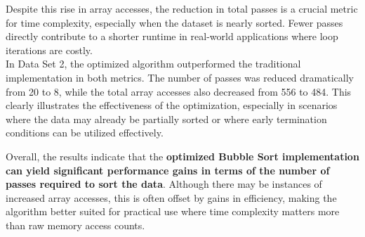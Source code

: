 Despite this rise in array accesses, the reduction in total passes is a crucial metric for time complexity, especially when the dataset is nearly sorted. Fewer passes directly contribute to a shorter runtime in real-world applications where loop iterations are costly.\\

In Data Set 2, the optimized algorithm outperformed the traditional implementation in both metrics. The number of passes was reduced dramatically from 20 to 8, while the total array accesses also decreased from 556 to 484. This clearly illustrates the effectiveness of the optimization, especially in scenarios where the data may already be partially sorted or where early termination conditions can be utilized effectively.

Overall, the results indicate that the \textbf{optimized Bubble Sort implementation can yield significant performance gains in terms of the number of passes required to sort the data}. Although there may be instances of increased array accesses, this is often offset by gains in efficiency, making the algorithm better suited for practical use where time complexity matters more than raw memory access counts.




